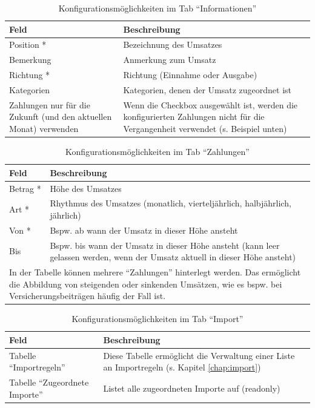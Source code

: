 \renewcommand{\arraystretch}{1.5}
\begin{table}[!ht]
\centering
\begin{tabular}{|p{6cm}|p{8cm}|}
\hline 
\textbf{Feld} & \textbf{Beschreibung} \\ 
\hline 
Position * & Bezeichnung des Umsatzes \\ 
\hline 
Bemerkung & Anmerkung zum Umsatz \\ 
\hline 
Richtung * & Richtung (Einnahme oder Ausgabe) \\ 
\hline 
Kategorien & Kategorien, denen der Umsatz zugeordnet ist \\ 
\hline 
Zahlungen nur für die Zukunft (und den aktuellen Monat) verwenden & Wenn die Checkbox ausgewählt ist, werden die konfigurierten Zahlungen nicht für die Vergangenheit verwendet (s. Beispiel unten) \\ 
\hline 
\end{tabular} 
\caption{Konfigurationsmöglichkeiten im Tab "`Informationen"'}
\end{table}
\renewcommand{\arraystretch}{1.0}

\renewcommand{\arraystretch}{1.5}
\begin{table}[!ht]
\centering
\begin{tabular}{|p{6cm}|p{8cm}|}
\hline 
\textbf{Feld} & \textbf{Beschreibung} \\ 
\hline 
Betrag * & Höhe des Umsatzes \\ 
\hline 
Art * & Rhythmus des Umsatzes (monatlich, vierteljährlich, halbjährlich, jährlich) \\ 
\hline 
Von * & Bspw. ab wann der Umsatz in dieser Höhe ansteht \\ 
\hline 
Bis & Bspw. bis wann der Umsatz in dieser Höhe ansteht (kann leer gelassen werden, wenn der Umsatz aktuell in dieser Höhe ansteht) \\ 
\hline 
\multicolumn{2}{|p{14cm}|}{In der Tabelle können mehrere "`Zahlungen"' hinterlegt werden. Das ermöglicht die Abbildung von steigenden oder sinkenden Umsätzen, wie es bspw. bei Versicherungsbeiträgen häufig der Fall ist.} \\ 
\hline 
\end{tabular} 
\caption{Konfigurationsmöglichkeiten im Tab "`Zahlungen"'}
\end{table}
\renewcommand{\arraystretch}{1.0}

\renewcommand{\arraystretch}{1.5}
\begin{table}[!ht]
\centering
\begin{tabular}{|p{6cm}|p{8cm}|}
\hline 
\textbf{Feld} & \textbf{Beschreibung} \\ 
\hline 
Tabelle "`Importregeln"' & Diese Tabelle ermöglicht die Verwaltung einer Liste an Importregeln (s. Kapitel \ref{chap:import}) \\ 
\hline 
Tabelle "`Zugeordnete Importe"' & Listet alle zugeordneten Importe auf (readonly) \\ 
\hline 
\end{tabular} 
\caption{Konfigurationsmöglichkeiten im Tab "`Import"'}
\end{table}
\renewcommand{\arraystretch}{1.0}

